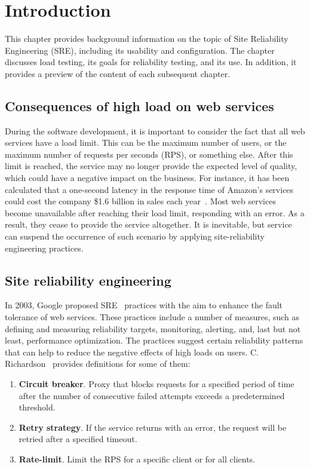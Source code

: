 \chapter{Introduction}
\label{ch:intro}

This chapter provides background information on the topic of Site Reliability Engineering (SRE), including its usability and configuration. The chapter discusses load testing, its goals for reliability testing, and its use. In addition, it provides a preview of the content of each subsequent chapter.


\section{Consequences of high load on web services}\label{sec:consequences-of-high-load-on-web-services}
During the software development, it is important to consider the fact that all web services have a load limit. This can be the maximum number of users, or the maximum number of requests per seconds (RPS), or something else. After this limit is reached, the service may no longer provide the expected level of quality, which could have a negative impact on the business. For instance, it has been calculated that a one-second latency in the response time of Amazon's services could cost the company \$1.6 billion in sales each year~\cite{one_second_article}.
Most web services become unavailable after reaching their load limit, responding with an error. As a result, they cease to provide the service altogether. It is inevitable, but service can suspend the occurrence of such scenario by applying site-reliability engineering practices.



\section{Site reliability engineering}\label{sec:site-reliability-engineering}
In 2003, Google proposed SRE~\cite{google_sre} practices with the aim to enhance the fault tolerance of web services. These practices include a number of measures, such as defining and measuring reliability targets, monitoring, alerting, and, last but not least, performance optimization. The practices suggest certain reliability patterns that can help to reduce the negative effects of high loads on users.
C. Richardson~\cite{microservices} provides definitions for some of them:
\begin{enumerate}
    \item \textbf{Circuit breaker}. Proxy that blocks requests for a specified period of time after the number of consecutive failed attempts exceeds a predetermined threshold.
    \item \textbf{Retry strategy}. If the service returns with an error, the request will be retried after a specified timeout.
    \item \textbf{Rate-limit}. Limit the RPS for a specific client or for all clients.
\end{enumerate}

